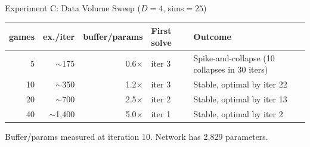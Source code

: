 \documentclass[aspectratio=169, 10pt]{beamer}
\begin{document}
\begin{frame}{Experiment C: Data Volume Sweep ($D{=}4$, sims$=25$)}

\centering
\begin{tabular}{rrrll}
\toprule
games & ex./iter & buffer/params & First solve & Outcome \\
\midrule
  5 & $\sim$175   & 0.6$\times$  & iter 3 & \textcolor{failure}{Spike-and-collapse (10 collapses in 30 iters)} \\
 10 & $\sim$350   & 1.2$\times$  & iter 3 & \textcolor{success}{Stable, optimal by iter 22} \\
 20 & $\sim$700   & 2.5$\times$  & iter 2 & \textcolor{success}{Stable, optimal by iter 13} \\
 40 & $\sim$1{,}400 & 5.0$\times$  & iter 1 & \textcolor{success}{Stable, optimal by iter 2} \\
\bottomrule
\end{tabular}

\vspace{0.2cm}
{\footnotesize Buffer/params measured at iteration 10. Network has 2{,}829 parameters.}

\vspace{0.5cm}
\begin{center}
\end{center}
\end{frame}
\end{document}
